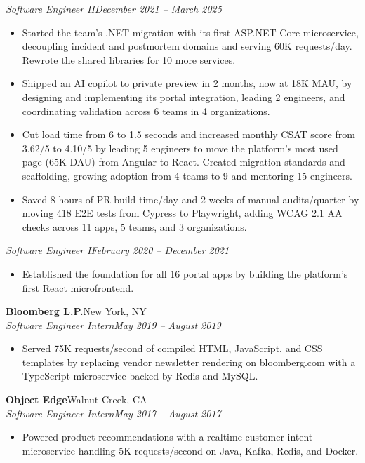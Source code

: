 \documentclass[letterpaper, 10pt]{article}
\newcommand{\role}[2]{
    \Needspace{5\baselineskip}
    \textit{#1}\hfill \textit{#2}\\[-2pt]
}
\newcommand{\experience}[4]{
    \vspace*{8pt}
    \Needspace{5\baselineskip}
    \textbf{#1}\hfill #2\\[-1pt]
    \textit{#3}\hfill \textit{#4}\\[-2pt]
}
\begin{document}
\vspace*{6pt}
\role{Software Engineer II}{December 2021 -- March 2025}
\begin{itemize}
    \item Started the team's .NET migration with its first ASP.NET Core microservice, decoupling incident and postmortem domains and serving 60K requests/day. Rewrote the shared libraries for 10 more services.
    \item Shipped an AI copilot to private preview in 2 months, now at 18K MAU, by designing and implementing its portal integration, leading 2 engineers, and coordinating validation across 6 teams in 4 organizations.
    \item Cut load time from 6 to 1.5 seconds and increased monthly CSAT score from 3.62/5 to 4.10/5 by leading 5 engineers to move the platform's most used page (65K DAU) from Angular to React. Created migration standards and scaffolding, growing adoption from 4 teams to 9 and mentoring 15 engineers.
    \item Saved 8 hours of PR build time/day and 2 weeks of manual audits/quarter by moving 418 E2E tests from Cypress to Playwright, adding WCAG 2.1 AA checks across 11 apps, 5 teams, and 3 organizations.
\end{itemize}

\vspace*{6pt}
\role{Software Engineer I}{February 2020 -- December 2021}
\begin{itemize}
    \item Established the foundation for all 16 portal apps by building the platform's first React microfrontend.
\end{itemize}

\experience{Bloomberg L.P.}{New York, NY}{Software Engineer Intern}{May 2019 -- August 2019}
\begin{itemize}
    \item Served 75K requests/second of compiled HTML, JavaScript, and CSS templates by replacing vendor newsletter rendering on bloomberg.com with a TypeScript microservice backed by Redis and MySQL.
\end{itemize}

\experience{Object Edge}{Walnut Creek, CA}{Software Engineer Intern}{May 2017 -- August 2017}
\begin{itemize}
    \item Powered product recommendations with a realtime customer intent microservice handling 5K requests/second on Java, Kafka, Redis, and Docker.
\end{itemize}
\end{document}
